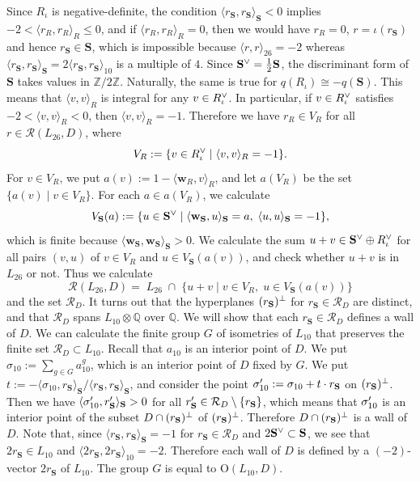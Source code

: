 \documentclass{amsart}
\numberwithin{equation}{section}
\numberwithin{table}{section}
\numberwithin{figure}{section}
\newcommand{\Q}{\mathord{\mathbb  Q}}
\newcommand{\Z}{\mathord{\mathbb Z}}
\newcommand{\RRR}{\mathord{\mathcal R}}
\newcommand{\set}[2]{\{ {#1}\mid {#2}  \}}
\newcommand{\shortset}[2]{\{ {#1} \mid  {#2}   \}}
\newcommand{\tensor}{\otimes}
\newcommand{\sprime}{\sp\prime}
\newcommand{\sperp}{\sp{\perp}}
\newcommand{\dual}{\sp{\vee}}
\newcommand{\OG}{\mathord{\mathrm{O}}}
\newcommand{\weyl}{\mathord{\mathbf w}}
\newcommand{\intfS}[1]{\langle #1\rangle_{\SS}}
\newcommand{\intfR}[1]{\langle #1\rangle_{R}}
\newcommand{\intfL}[1]{\langle #1\rangle_{10}}
\newcommand{\intfLL}[1]{\langle #1\rangle_{26}}
\renewcommand{\SS}{\mathbf{S}}
\begin{document}
Since $R_{\iota}$ is negative-definite,
the condition $\intfS{r_{\SS}, r_{\SS}}<0$ implies  $-2<\intfR{r_R, r_R}\le 0$,
and if $\intfR{r_R, r_R}=0$,
then we would have $r_R=0$, $r=\iota(r_{\SS})$ and hence $r_{\SS}\in \SS$,
which is impossible because $\intfLL{r,r}=-2$ whereas
$\intfS{r_{\SS}, r_{\SS}}=2\intfL{r_{\SS}, r_{\SS}}$ is a multiple of $4$.
Since $\SS\dual = \frac{1}{2} \SS$,
the discriminant form of $\SS$ takes values in $\Z / 2\Z$.
Naturally, the same is true for $q(R_{\iota})\cong -q(\SS)$.
This means that $\intfR{v,v}$ is integral for any $v \in R_{\iota}\dual$.
In particular, if $v\in R_{\iota}\sp{\vee}$ satisfies $-2<\intfR{v, v}<0$, then $\intfR{v, v}=-1$.
Therefore we  have $r_R\in V_R$ for all $r\in \RRR(L_{26}, D)$, where
\[
V_R:=\set{v\in R_{\iota}\dual}{\intfR{v, v}=-1}.
\]
For $v\in V_R$, we put $a(v):=1-\intfR{\weyl_R, v}$,
and let $a(V_R)$ be the set $\shortset{a(v)}{v\in V_R}$.
For each $a\in a(V_R)$, we calculate
\[
V_{\SS}(a):=\set{u\in \SS\dual}{\intfS{\weyl_{\SS}, u}=a, \; \intfS{u, u}=-1},
\]
which is finite because $\intfS{\weyl_{\SS}, \weyl_{\SS}}>0$.
We calculate the sum $u+v \in \SS\dual \oplus R_{\iota}\dual$ for all pairs $(v, u)$
of $v\in V_R$ and $u\in V_{\SS}(a(v))$,
and check whether $u+v$ is in $L_{26}$ or not.
Thus we calculate
\[
\RRR(L_{26}, D)=\; L_{26}\;\cap \; \set{u+v}{v\in V_R, \;u\in V_{\SS}(a(v))}
\]
and the set $\RRR_D$.
It turns out that
the hyperplanes $(r_{\SS})\sperp$ for $r_{\SS}\in \RRR_D$ are distinct,
and that $\RRR_D$ spans $L_{10}\tensor\Q$ over $\Q$.
We will show that each $r_{\SS}\in \RRR_D$ defines a wall of $D$.
We can calculate the finite group $G$ of isometries of $L_{10}$
that preserves the finite set $\RRR_D\subset L_{10}$.
Recall that $a_{10}$ is an interior point of $D$.
We put
$\sigma_{10}:=\sum_{g\in G} a_{10}^g$,
which is
an interior point  of $D$
fixed by $G$.
We put $t:=-\intfS{\sigma_{10}, r_{\SS}}/\intfS{r_{\SS}, r_{\SS}}$,
and consider the point $\sigma\sprime_{10}:=\sigma_{10}+ t\cdot r_{\SS}$  on $(r_{\SS})\sperp$.
Then we have $\intfS{\sigma\sprime_{10}, r\sprime_{\SS}}>0$ for all
$r\sprime_{\SS} \in \RRR_D\setminus \{r_{\SS}\}$,
which means that $\sigma\sprime_{10}$ is an interior point of
the subset $D\cap (r_{\SS})\sperp$ of $(r_{\SS})\sperp$.
Therefore  $D\cap (r_{\SS})\sperp$  is a wall of $D$.
Note that, since $\intfS{r_{\SS}, r_{\SS}}=-1$ for $r_{\SS}\in \RRR_D$
and $2\SS\dual \subset \SS$, we see that $2r_{\SS}\in L_{10}$ and $\intfL{2 r_{\SS}, 2 r_{\SS}}=-2$.
Therefore each wall of $D$ is defined by a $(-2)$-vector $2r_{\SS}$ of $L_{10}$.
The group $G$ is equal to $\OG(L_{10}, D)$.
\end{document}
